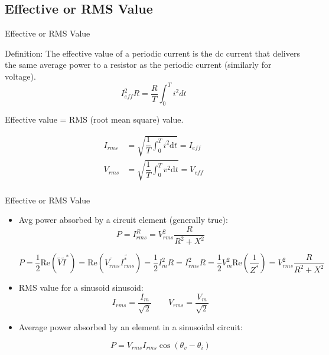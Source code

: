 \documentclass{beamer}
\begin{document}
\subsection{Effective or RMS Value}
\begin{frame}{Effective or RMS Value}

Definition: The effective value of a periodic current is the dc current that delivers the same average power to a resistor as the periodic current (similarly for voltage).
$$I_{eff}^2R = \frac{R}{T}\int_0^Ti^2dt$$

Effective value = RMS (root mean square) value.


\begin{equation*}
\begin{aligned}
I_{rms} &= \sqrt{\dfrac{1}{T} \int_{0}^{T} i^{2} \mathrm{d} t} = I_{eff} \\
V_{rms} &= \sqrt{\dfrac{1}{T} \int_{0}^{T} v^{2} \mathrm{d} t} = V_{eff} \\
\end{aligned}
\end{equation*}

\end{frame}


\begin{frame}{Effective or RMS Value}

\begin{itemize}
    \item Avg power absorbed by a circuit element (generally true):
$$P = I_{rms}^R=V_{rms}^2\frac{R}{R^2+X^2}$$
\begin{tiny}
\begin{center}
    $P = \dfrac{1}{2}\mathrm{Re}(\tilde{V}\tilde{I}^{*})=\mathrm{Re}(\tilde{V_{rms}}\tilde{I^{*}_{rms}}) = \dfrac{1}{2} I_{m}^{2} R=I_{rms}^{2}R = \dfrac{1}{2} V_{m}^{2} \mathrm{Re} (\dfrac{1}{Z^{*}}) = V_{rms}^{2} \dfrac{R}{R^{2}+X^{2}}$
\end{center}

\hspace{0.1mm}
\end{tiny}
    \item RMS value for a sinusoid \color{red} sinusoid\color{black}: 
\begin{equation*}
I_{rms} = \dfrac{I_{m}}{\sqrt{2}} \qquad
V_{rms} = \dfrac{V_{m}}{\sqrt{2}}
\end{equation*}

    \item Average power absorbed by an element in a \color{red}sinusoidal \color{black}  circuit:

    $$P = V_{rms}I_{rms}\cos(\theta_v-\theta_i)$$
    
\end{itemize}

\end{frame}
\end{document}

